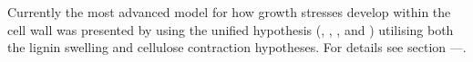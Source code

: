 Currently the most advanced model for how growth stresses develop within the
cell wall was presented by \cite{Alm_ras_2005} using the unified hypothesis
(\cite{okuyama1986}, \cite{Okuyama_1994}, \cite{yamamoto1991}, \cite{ISI:A1992HP18200001} and \cite{Yamamoto_1998}) utilising both the lignin swelling and
cellulose contraction hypotheses. For details see section ---.